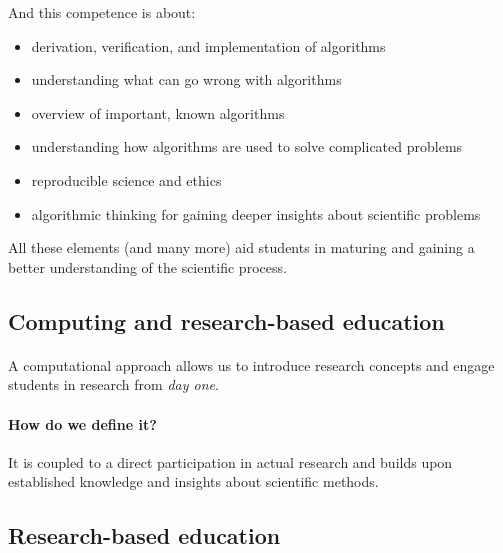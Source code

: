 \documentclass[%
oneside,                 %
final,                   %
10pt]{article}
\begin{document}
And this  competence is about:

\begin{itemize}
\item derivation, verification, and implementation of algorithms

\item understanding what can go wrong with algorithms

\item overview of important, known algorithms

\item understanding how algorithms are used to solve complicated problems

\item reproducible science and ethics

\item algorithmic thinking for gaining deeper insights about scientific problems
\end{itemize}

\noindent
All these elements (and many more) aid students in maturing and gaining a better understanding of the scientific process.







\subsection*{Computing and research-based education}

\paragraph{}
A computational approach allows us to introduce research concepts and engage students in research from \emph{day one}.



\paragraph{How do we define it?}
It is coupled to a direct participation in actual research and builds upon established
knowledge and insights about scientific methods.





\subsection*{Research-based education}
\end{document}
